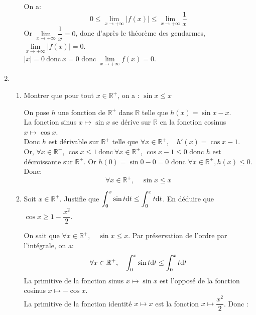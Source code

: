 \documentclass[a4paper,french,bookmarks]{article}
\begin{document}
\begin{enumerate}
\begin{enumerate}
 \begin{tcolorbox}[colback=black!3,colframe=black!9,boxrule=.25pt,enhanced,arc is angular,arc=0pt]
 On a:
 \[ 0 \leq \lim\limits_{x \to +\infty} \left|f\left(x\right)\right| \leq \lim\limits_{x \to +\infty} \dfrac{1}{x} \]
 Or $\lim\limits_{x \to +\infty} \dfrac{1}{x} = 0$, donc d'après le théorème des gendarmes, $\lim\limits_{x \to +\infty} \left|f\left(x\right)\right| = 0$.\\
 $\left|x\right| = 0 \ \text{donc} \ x = 0$ donc $\lim\limits_{x \to +\infty} f(x) = 0$.
  \end{tcolorbox}
\end{enumerate}
\item
\begin{enumerate}
    \item Montrer que pour tout $x \in \mathbb{R}^+$, on a : \quad $\sin x \leq x$
     \begin{tcolorbox}[colback=black!3,colframe=black!9,boxrule=.25pt,enhanced,arc is angular,arc=0pt]
     On pose $h$ une fonction de $\mathbb{R}^+$ dans $\mathbb{R}$ telle que $h(x)=\sin x - x$.\\
     La fonction sinus $x \mapsto \sin x$ se dérive sur $\mathbb{R}$ en la fonction cosinus $x \mapsto \cos x$.\\
     Donc $h$ est dérivable sur $\mathbb{R}^+$ telle que $\forall x \in \mathbb{R}^+, \quad h'(x) = \cos x - 1$.\\
     Or, $\forall x \in \mathbb{R}^+$, $\cos x \leq 1 \ \text{donc} \ \forall x \in \mathbb{R}^+$, $\cos x - 1 \leq 0$ donc $h$ est décroissante sur $\mathbb{R}^+$.
     Or $h(0)=\sin 0 - 0 = 0$ donc $\forall x \in \mathbb{R}^+, h(x) \leq 0$. Donc:
     \[ \forall x \in \mathbb{R}^+, \quad \sin x \leq x \]
     \end{tcolorbox}
 \item Soit $x \in \mathbb{R}^+$. Justifie que $\displaystyle\int_0^x \sin t \text dt \leq \int_0^x t \text dt$. En déduire que $\cos x \geq 1 - \dfrac{x^2}{2}$.
 \begin{tcolorbox}[colback=black!3,colframe=black!9,boxrule=.25pt,enhanced,arc is angular,arc=0pt]
 On sait que $\forall x \in \mathbb{R}^+, \quad \sin x \leq x$. Par préservation de l'ordre par l'intégrale, on a:
 \[ \forall x \in \mathbb{R}^+, \quad \int_0^x \sin t \text dt \leq \int_0^x t \text dt \]
 La primitive de la fonction sinus $x \mapsto \sin x$ est l'opposé de la fonction cosinus $x \mapsto -\cos x$.\\
 La primitive de la fonction identité $x \mapsto x$ est la fonction $x \mapsto \dfrac{x^2}{2}$. Donc :

\end{tcolorbox}
\end{enumerate}
\end{enumerate}
\end{document}
